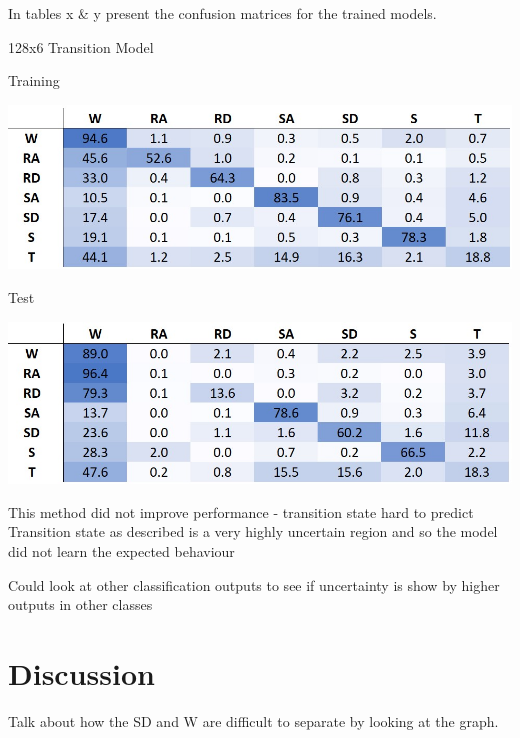 \documentclass[sensors,article,submit,moreauthors,pdftex]{Definitions/mdpi}
\begin{document}
In tables x \& y present the confusion matrices for the trained models.
\begin{table}[!hbt]
    \centering
    \caption{128x6 Transition Model}
    \label{tab:128x6_transition_confusion_matrix}
    \begin{subtable}{.45\textwidth}
        \centering
        \caption{Training}
        \label{tab:tran_model_conf_matrix_training}
        \includegraphics[width=\textwidth]{Figures/results/conf_matricies/Training_128x6_T.jpg}
    \end{subtable}
    \hfil
    \begin{subtable}{.45\textwidth}
        \centering
        \caption{Test}
        \label{tab:tran_model_conf_matrix_test}
        \includegraphics[width=\textwidth]{Figures/results/conf_matricies/Test_128x6_T.jpg}
    \end{subtable}
\end{table}

This method did not improve performance - transition state hard to predict
Transition state as described is a very highly uncertain region and so the model did not learn the expected behaviour

Could look at other classification outputs to see if uncertainty is show by higher outputs in other classes


\section{Discussion}%
Talk about how the SD and W are difficult to separate by looking at the graph.
\end{document}
